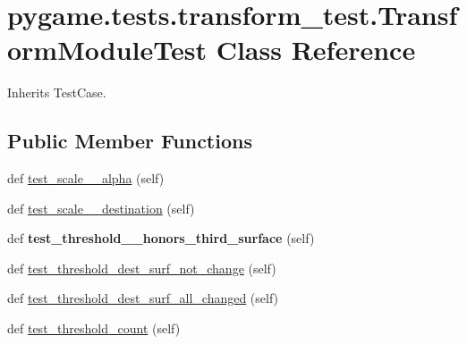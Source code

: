 \hypertarget{classpygame_1_1tests_1_1transform__test_1_1_transform_module_test}{}\section{pygame.\+tests.\+transform\+\_\+test.\+Transform\+Module\+Test Class Reference}
\label{classpygame_1_1tests_1_1transform__test_1_1_transform_module_test}


Inherits Test\+Case.

\subsection*{Public Member Functions}
\begin{DoxyCompactItemize}
\item 
def \hyperlink{classpygame_1_1tests_1_1transform__test_1_1_transform_module_test_a90a1c95c690992aea0b9acd88eea0d2d}{test\+\_\+scale\+\_\+\+\_\+alpha} (self)
\item 
def \hyperlink{classpygame_1_1tests_1_1transform__test_1_1_transform_module_test_a72eab485e57093ea54d57708cd07bad1}{test\+\_\+scale\+\_\+\+\_\+destination} (self)
\item 
\mbox{\label{classpygame_1_1tests_1_1transform__test_1_1_transform_module_test_a7c7028963ff50ff3cf7225e251a320ec}} 
def {\bfseries test\+\_\+threshold\+\_\+\+\_\+honors\+\_\+third\+\_\+surface} (self)
\item 
def \hyperlink{classpygame_1_1tests_1_1transform__test_1_1_transform_module_test_a17ca645f4b2ebbe08e3444a6fac09997}{test\+\_\+threshold\+\_\+dest\+\_\+surf\+\_\+not\+\_\+change} (self)
\item 
def \hyperlink{classpygame_1_1tests_1_1transform__test_1_1_transform_module_test_a8bb591aedb1a7fb65d47dda252cab7f9}{test\+\_\+threshold\+\_\+dest\+\_\+surf\+\_\+all\+\_\+changed} (self)
\item 
def \hyperlink{classpygame_1_1tests_1_1transform__test_1_1_transform_module_test_a19ca0d31653ddcaf47c17d7f16969d8f}{test\+\_\+threshold\+\_\+count} (self)
\item 
\mbox{\label{classpygame_1_1tests_1_1transform__test_1_1_transform_module_test_aad43f131026d9765fa19804dbbb742e0}} 

\end{DoxyCompactItemize}

